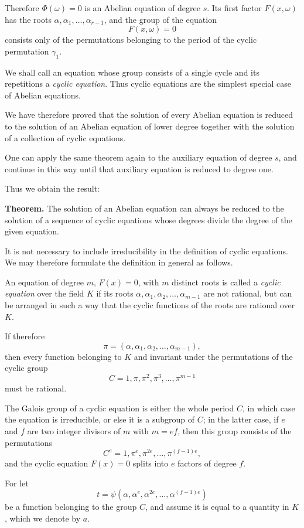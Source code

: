 \documentclass[11pt,a4paper]{book}
\begin{document}
Therefore $\Phi(\omega)=0$ is an Abelian equation of degree $s$. Its first factor $F(x,\omega)$ has the roots $\alpha,\alpha_1,\dots,\alpha_{r-1}$, and the group of the equation
\[
F(x,\omega)=0
\]
consists only of the permutations belonging to the period of the cyclic permutation $\gamma_1$.

We shall call an equation whose group consists of a single cycle and its repetitions a \emph{cyclic equation}. Thus cyclic equations are the simplest special case of Abelian equations.

We have therefore proved that the solution of every Abelian equation is reduced to the solution of an Abelian equation of lower degree together with the solution of a collection of cyclic equations.

One can apply the same theorem again to the auxiliary equation of degree $s$, and continue in this way until that auxiliary equation is reduced to degree one.

Thus we obtain the result:

\medskip
\noindent\textbf{Theorem.}
The solution of an Abelian equation can always be reduced to the solution of a sequence of cyclic equations whose degrees divide the degree of the given equation.

\medskip
It is not necessary to include irreducibility in the definition of cyclic equations. We may therefore formulate the definition in general as follows.

An equation of degree $m$, $F(x)=0$, with $m$ distinct roots is called a \emph{cyclic equation} over the field $K$ if its roots $\alpha,\alpha_1,\alpha_2,\dots,\alpha_{m-1}$ are not rational, but can be arranged in such a way that the cyclic functions of the roots are rational over $K$.

If therefore
\[
\pi=(\alpha,\alpha_1,\alpha_2,\dots,\alpha_{m-1}),
\tag{6}
\]
then every function belonging to $K$ and invariant under the permutations of the cyclic group
\[
C=1,\pi,\pi^2,\pi^3,\dots,\pi^{m-1}
\tag{7}
\]
must be rational.

The Galois group of a cyclic equation is either the whole period $C$, in which case the equation is irreducible, or else it is a subgroup of $C$; in the latter case, if $e$ and $f$ are two integer divisors of $m$ with $m=ef$, then this group consists of the permutations
\[
C^e = 1,\pi^e,\pi^{2e},\dots,\pi^{(f-1)e},
\tag{8}
\]
and the cyclic equation $F(x)=0$ splits into $e$ factors of degree $f$.

For let
\[
t=\psi(\alpha,\alpha^e,\alpha^{2e},\dots,\alpha^{(f-1)e})
\]
be a function belonging to the group $C$, and assume it is equal to a quantity in $K$, which we denote by $a$.
\end{document}
